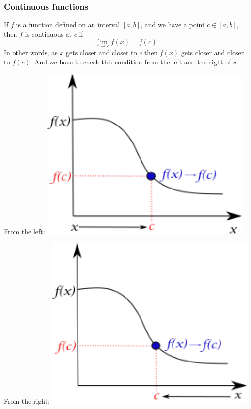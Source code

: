 \documentclass{if-beamer}
\begin{document}
\begin{frame}
\frametitle{Continuous functions}
If $f$ is a function defined on an interval $[a,b]$, and we have a
point $c \in [a,b]$, then $f$ is continuous at $c$ if
\begin{equation}
\lim_{x \rightarrow c} f(x) = f(c)
\end{equation}
In other words, as $x$ gets closer and closer to $c$ then $f(x)$ gets closer and closer to $f(c)$. And we have to check this condition from the left and the right of $c$. \\
\vspace{10pt}
\begin{minipage}{0.5\textwidth}
	From the left:
	\centering
	\includegraphics[width = 0.8\textwidth]{figures/left}
\end{minipage}
\begin{minipage}{0.5\textwidth}
	From the right:
	\centering
	\includegraphics[width = 0.8\textwidth]{figures/right}
\end{minipage}
\end{frame}
\end{document}
